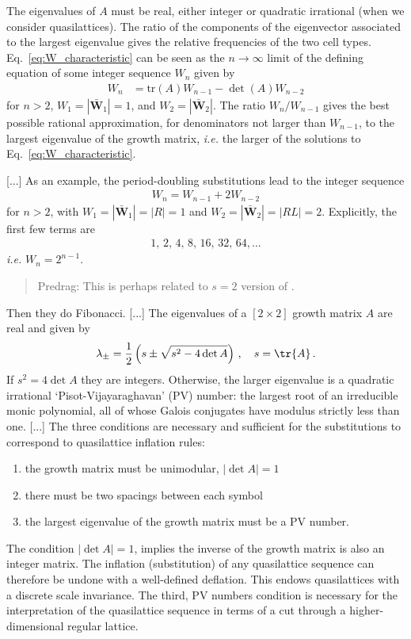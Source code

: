 %
The eigenvalues of $A$  must be real, either integer or quadratic irrational
(when we consider quasilattices).
The ratio of the components of the eigenvector associated to the largest
eigenvalue gives the relative frequencies of the two cell
types.
Eq.~\eqref{eq:W_characteristic} can be seen as the $n\rightarrow\infty$
limit of the defining equation of some integer sequence $W_n$ given by
%
\begin{align}
W_{n}&=\text{tr}\left(A\right)W_{n-1}-\det\left(A\right)W_{n-2}
\end{align}
for $n>2$, $W_1=\left|\bar{\mathbf{W}}_1\right|=1$, and
$W_2=\left|\bar{\mathbf{W}}_2\right|$. The ratio $W_n/W_{n-1}$ gives the
best possible rational approximation, for denominators not larger than
$W_{n-1}$, to the largest eigenvalue of the growth matrix, \emph{i.e.}
the larger of the solutions to Eq.~\eqref{eq:W_characteristic}.

[...]
As an example, the period-doubling substitutions lead to
the integer sequence
%
\begin{align}
W_n=W_{n-1}+2W_{n-2}
\end{align}
%
for $n>2$, with $W_1=\left|\bar{\mathbf{W}}_1\right|=\left|R\right|=1$ and $W_2=\left|\bar{\mathbf{W}}_2\right|=\left|RL\right|=2$. Explicitly, the first few terms are
%
\begin{align}
1,\,2,\,4,\,8,\,16,\,32,\,64,\ldots
\end{align}
%
\emph{i.e.} $W_n=2^{n-1}$.
\begin{quote}
Predrag: This is perhaps related to $s=2$ version of
.
\end{quote}
Then they do Fibonacci.
[...]
The eigenvalues of a $[2\times2]$ growth matrix $A$ are real and given by
%
\begin{align}
\lambda_\pm=
\frac{1}{2}\left({s}\pm\sqrt{{s}^2-4\det{A}}\right)
\,,\quad
{s}=\tr{A}
\,.
\label{eq:characteristic}
\end{align}
%
If ${s}^2=4\det{A}$ they are integers. Otherwise,
the larger eigenvalue is a quadratic irrational `Pisot-Vijayaraghavan'
(PV) number: the largest root of an irreducible monic polynomial, all of
whose Galois conjugates have modulus strictly less than
one.
[...]
The three conditions are necessary and sufficient for the
substitutions to correspond to quasilattice inflation
rules:
\begin{enumerate}
\item the growth matrix must be unimodular, $\left|\det{A}\right|=1$
\item there must be two spacings between each symbol
\item the largest eigenvalue of the growth matrix must be a PV number.
\end{enumerate}
The condition $\left|\det{A}\right|=1$, implies the inverse of the growth
matrix is also an integer matrix. The
inflation (substitution) of any quasilattice sequence can therefore be
undone with a well-defined deflation. This endows quasilattices with a
discrete scale invariance.
The third, PV numbers condition is necessary for the
interpretation of the quasilattice sequence in terms of a cut through a
higher-dimensional regular lattice.

